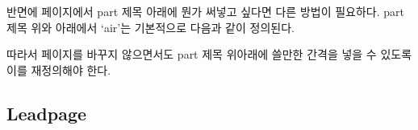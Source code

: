 반면에 \cmd{\part} 페이지에서 part 제목 아래에 뭔가 써넣고 싶다면 다른 방법이
필요하다. part 제목 위와 아래에서 `air'는 기본적으로 다음과 같이 정의된다.
\begin{lcode}
  \newcommand*{\beforepartskip}{\null\vfil}
  \newcommand*{\afterpartskip}{\vfil\newpage}
\end{lcode}
따라서 페이지를 바꾸지 않으면서도 part 제목 위아래에 쓸만한 간격을 넣을 수 있도록
이를 재정의해야 한다.
\begin{lcode}
\makeatletter
  \newcommand*{\beforepartskip}{\null\vskip4cm}
  \newcommand*{\afterpartskip}{\par\vskip1cm%
    \@afterindentfalse\@afterheading}
\makeatother
\end{lcode}




\subsection{Leadpage}

